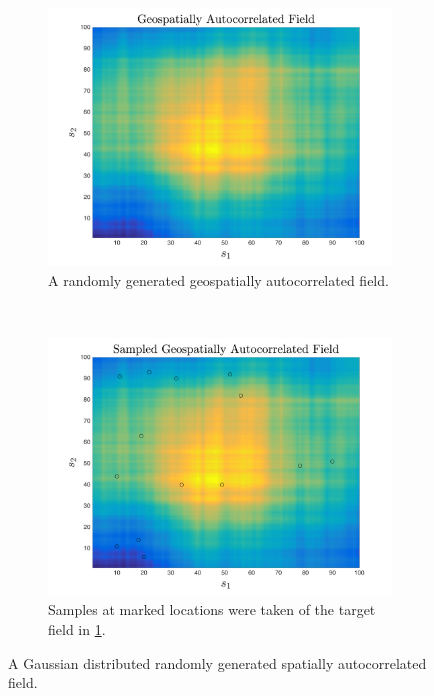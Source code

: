 \documentclass[11pt]{ucthesis}
\begin{document}
\begin{figure}[ht!]
    \centering
    \begin{subfigure}[t]{0.5\textwidth}
        \centering
        \includegraphics[width=\linewidth]{figures/generated_field.png}
        \captionsetup{skip=0.5\baselineskip,size=footnotesize}
        \caption{A randomly generated geospatially autocorrelated field.}
		\label{fig:gen_field}
    \end{subfigure}%
    ~ 
    \begin{subfigure}[t]{0.5\textwidth}
        \centering
        \includegraphics[width=\linewidth]{figures/sampled_generated_field.png}
		\captionsetup{skip=0.5\baselineskip,size=footnotesize}
		\caption{Samples at marked locations were taken of the target field in \ref{fig:gen_field}.}
		\label{fig:sampled_field}
    \end{subfigure}
    \caption{A Gaussian distributed randomly generated spatially autocorrelated field.}
    \label{fig:generated_and_sampled_field}
\end{figure}
\end{document}
